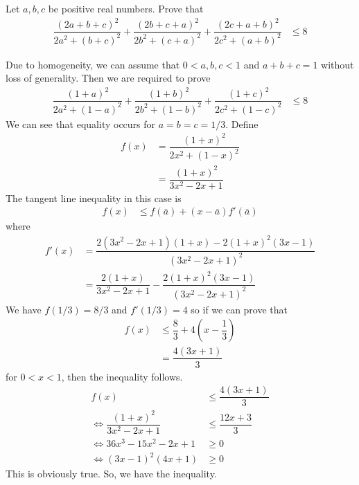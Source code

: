\documentclass[inequalities.tex]{subfile}
\begin{document}
		\begin{problem}[USAMO $2003$]\label{prob:usamo2003}
			Let $a,b,c$ be positive real numbers. Prove that
				\begin{align*}
					\dfrac{(2a+b+c)^{2}}{2a^{2}+(b+c)^{2}}+\dfrac{(2b+c+a)^{2}}{2b^{2}+(c+a)^{2}}+\dfrac{(2c+a+b)^{2}}{2c^{2}+(a+b)^{2}}
						& \leq 8
				\end{align*}
			
				\begin{solution}
					Due to homogeneity, we can assume that $0<a,b,c<1$ and $a+b+c=1$ without loss of generality. Then we are required to prove
						\begin{align*}
							\dfrac{(1+a)^{2}}{2a^{2}+(1-a)^{2}}+\dfrac{(1+b)^{2}}{2b^{2}+(1-b)^{2}}+\dfrac{(1+c)^{2}}{2c^{2}+(1-c)^{2}}
								& \leq 8
						\end{align*}
					We can see that equality occurs for $a=b=c=1/3$. Define
						\begin{align*}
							f(x)
								& = \dfrac{(1+x)^{2}}{2x^{2}+(1-x)^{2}}\\
								& = \dfrac{(1+x)^{2}}{3x^{2}-2x+1}
						\end{align*}
					The tangent line inequality in this case is
						\begin{align*}
							f(x)
								& \leq f(\bar{a})+(x-\bar{a})f'(\bar{a})
						\end{align*}
					where
						\begin{align*}
							f'(x)
								& = \dfrac{2(3x^{2}-2x+1)(1+x)-2(1+x)^{2}(3x-1)}{(3x^{2}-2x+1)^{2}}\\
								& = \dfrac{2(1+x)}{3x^{2}-2x+1}-\dfrac{2(1+x)^{2}(3x-1)}{(3x^{2}-2x+1)^{2}}
						\end{align*}
					We have $f(1/3)=8/3$ and $f'(1/3)=4$ so if we can prove that
						\begin{align*}
							f(x)
								& \leq \dfrac{8}{3}+4\left(x-\dfrac{1}{3}\right)\\
								& = \dfrac{4(3x+1)}{3}
						\end{align*}
					for $0<x<1$, then the inequality follows.
						\begin{align*}
							f(x)
								& \leq \dfrac{4(3x+1)}{3}\\
							\iff \dfrac{(1+x)^{2}}{3x^{2}-2x+1}
								& \leq \dfrac{12x+3}{3}\\
							\iff 36x^{3}-15x^{2}-2x+1
									& \geq 0\\
							\iff (3x-1)^{2}(4x+1)
								& \geq 0
						\end{align*}
					This is obviously true. So, we have the inequality.
				\end{solution}
		\end{problem}
\end{document}
